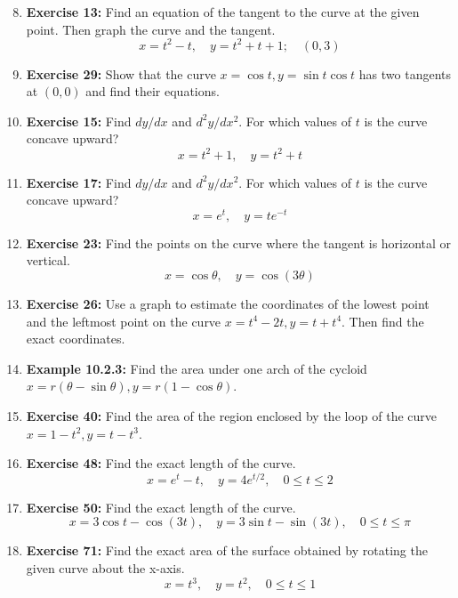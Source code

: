 \documentclass[12pt, a4paper]{article}
\begin{document}
\begin{enumerate}
    \setcounter{enumi}{7}
    \item \textbf{Exercise 13:} Find an equation of the tangent to the curve at the given point. Then graph the curve and the tangent.
    \[ x = t^2-t, \quad y = t^2+t+1; \quad (0,3) \]
    
    \item \textbf{Exercise 29:} Show that the curve $x = \cos t, y = \sin t \cos t$ has two tangents at $(0,0)$ and find their equations.
    
    \item \textbf{Exercise 15:} Find $dy/dx$ and $d^2y/dx^2$. For which values of $t$ is the curve concave upward?
    \[ x = t^2+1, \quad y = t^2+t \]
    
    \item \textbf{Exercise 17:} Find $dy/dx$ and $d^2y/dx^2$. For which values of $t$ is the curve concave upward?
    \[ x = e^t, \quad y = te^{-t} \]
    
    \item \textbf{Exercise 23:} Find the points on the curve where the tangent is horizontal or vertical.
    \[ x = \cos\theta, \quad y = \cos(3\theta) \]
    
    \item \textbf{Exercise 26:} Use a graph to estimate the coordinates of the lowest point and the leftmost point on the curve $x=t^4-2t, y=t+t^4$. Then find the exact coordinates.
    
    \item \textbf{Example 10.2.3:} Find the area under one arch of the cycloid $x = r(\theta - \sin\theta), y = r(1-\cos\theta)$.
    
    \item \textbf{Exercise 40:} Find the area of the region enclosed by the loop of the curve $x=1-t^2, y=t-t^3$.
    
    \item \textbf{Exercise 48:} Find the exact length of the curve.
    \[ x = e^t - t, \quad y = 4e^{t/2}, \quad 0 \le t \le 2 \]
    
    \item \textbf{Exercise 50:} Find the exact length of the curve.
    \[ x = 3\cos t - \cos(3t), \quad y = 3\sin t - \sin(3t), \quad 0 \le t \le \pi \]
    
    \item \textbf{Exercise 71:} Find the exact area of the surface obtained by rotating the given curve about the x-axis.
    \[ x=t^3, \quad y=t^2, \quad 0 \le t \le 1 \]
    

\end{enumerate}
\end{document}
